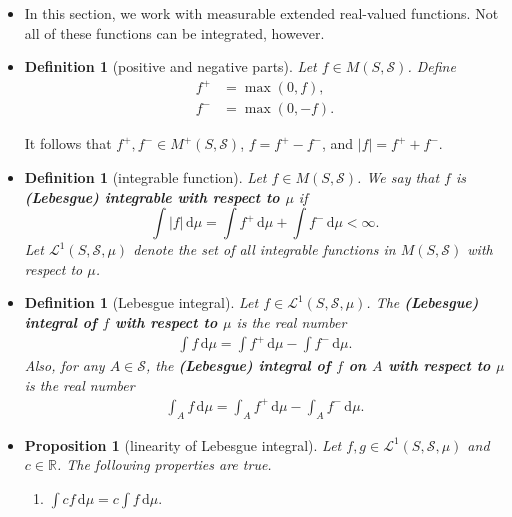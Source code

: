 \documentclass[10pt]{article}
\newtheorem{definition}[lemma]{Definition}
\newtheorem{proposition}[lemma]{Proposition}
\numberwithin{lemma}{section}
\newcommand{\dee}{\mathrm{d}}
\newcommand{\mcal}[1]{\mathcal{#1}}
\newcommand{\Real}{\mathbb{R}}
\begin{document}
\begin{itemize}
  \item In this section, we work with measurable extended real-valued functions. Not all of these functions can be integrated, however.
  
  \item \begin{definition}[positive and negative parts]
    Let $f \in M(S,\mcal{S})$. Define
    \begin{align*}
      f^+ &= \max(0, f), \\
      f^- &= \max(0, -f).
    \end{align*}
  \end{definition}
  It follows that $f^+, f^- \in M^+(S,\mcal{S})$, $f = f^+ - f^-$, and $|f| = f^+ + f^-$.

  \item \begin{definition}[integrable function]
    Let $f \in M(S,\mcal{S})$. We say that $f$ is {\bf (Lebesgue) integrable with respect to $\mu$} if $$\int |f|\, \dee\mu = \int f^+\, \dee\mu + \int f^-\, \dee\mu < \infty.$$ Let $\mcal{L}^1(S, \mcal{S}, \mu)$ denote the set of all integrable functions in $M(S,\mcal{S})$ with respect to $\mu$.
  \end{definition}

  \item \begin{definition}[Lebesgue integral]
    Let $f \in \mcal{L}^1(S,\mcal{S},\mu)$. The {\bf (Lebesgue) integral of $f$ with respect to $\mu$} is the real number
    \begin{align*}
      \int f\, \dee\mu = \int f^+\,\dee\mu - \int f^-\,\dee\mu.
    \end{align*}
    Also, for any $A \in \mcal{S}$, the {\bf (Lebesgue) integral of $f$ on $A$ with respect to $\mu$} is the real number
    \begin{align*}
      \int_A f\, \dee\mu = \int_A f^+\,\dee\mu - \int_A f^-\,\dee\mu.
    \end{align*}
  \end{definition}

  \item \begin{proposition}[linearity of Lebesgue integral]
    Let $f,g \in \mcal{L}^1(S, \mcal{S}, \mu)$ and $c \in \Real$. The following properties are true.
    \begin{enumerate}
      \item $\int cf\, \dee\mu = c \int f\, \dee\mu.$
      

\end{enumerate}
\end{proposition}
\end{itemize}
\end{document}
